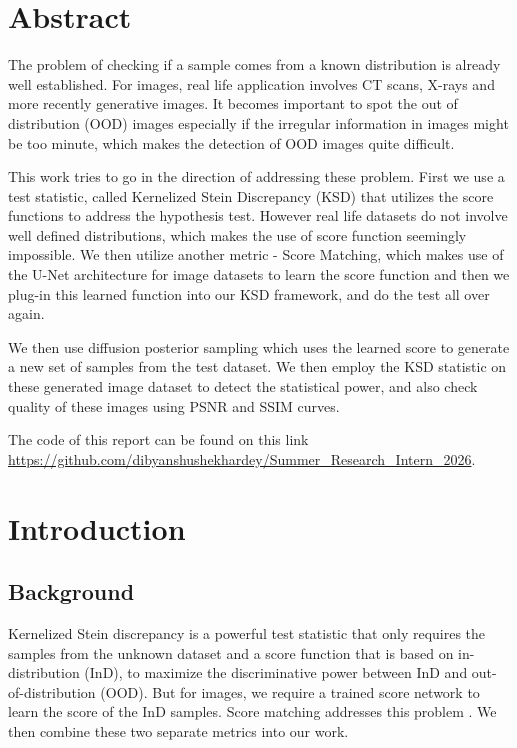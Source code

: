 \documentclass[12pt,a4paper]{report}
\begin{document}
\tableofcontents
\newpage

\chapter*{Abstract}
\vspace{0.3cm}
\noindent
The problem of checking if a sample comes from a known distribution is already well established. For images, real life application involves CT scans, X-rays and more recently generative images. It becomes important to spot the out of distribution (OOD) images especially if the irregular information in images might be too minute, which makes the detection of OOD images quite difficult.

\vspace{0.3cm}
\noindent
This work tries to go in the direction of addressing these problem. First we use a test statistic, called Kernelized Stein Discrepancy (KSD) that utilizes the score functions to address the hypothesis test. However real life datasets do not involve well defined distributions, which makes the use of score function seemingly impossible. We then utilize another metric - Score Matching, which makes use of the U-Net architecture for image datasets to learn the score function and then we plug-in this learned function into our KSD framework, and do the test all over again.

\vspace{0.3cm}
\noindent
We then use diffusion posterior sampling which uses the learned score to generate a new set of samples from the test dataset. We then employ the KSD statistic on these generated image dataset to detect the statistical power, and also check quality of these images using PSNR and SSIM curves.

\vspace{0.3cm}
\noindent
The code of this report can be found on this link
\url{https://github.com/dibyanshushekhardey/Summer_Research_Intern_2026}.

\clearpage

\setcounter{page}{1}
\chapter{Introduction}
\section{Background}
Kernelized Stein discrepancy is a powerful test statistic that only requires the samples from the unknown dataset and a score function that is based on in-distribution (InD), to maximize the discriminative power between InD and out-of-distribution (OOD). But for images, we require a trained score network to learn the score of the InD samples. Score matching addresses this problem \cite{song2021scorebasedgenerativemodelingstochastic}. We then combine these two separate metrics into our work.
\end{document}
